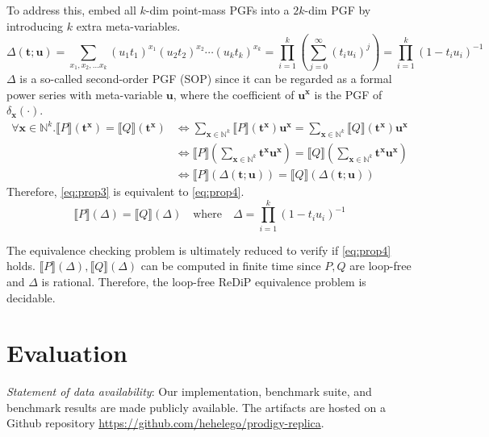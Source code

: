 \documentclass[a4paper]{article}
\renewcommand{\S}[1]{ \llbracket #1 \rrbracket }
\begin{document}
\begin{enumerate}
	      To address this, embed all \(k\)-dim point-mass PGFs into a \(2k\)-dim PGF by introducing \(k\) extra meta-variables.
	      \[
		      \Delta(\mathbf{t};\mathbf{u})
		      = \sum_{x_1,x_2,\ldots x_k} (u_1 t_1)^{x_1}(u_2 t_2)^{x_2}\cdots (u_k t_k)^{x_k}
		      = \prod_{i=1}^k \left( \sum_{j=0}^\infty (t_i u_i)^j \right)
		      = \prod_{i=1}^k (1-t_i u_i)^{-1}
	      \]
	      \(\Delta\) is a so-called second-order PGF (SOP) since it can be regarded as a formal power series with meta-variable \(\mathbf{u}\),
	      where the coefficient of \(\mathbf{u}^{\mathbf{x}}\) is the PGF of \(\delta_{\mathbf{x}}(\cdot)\).
	      \begin{align*}
		      \forall \mathbf{x} \in \mathbb{N}^k . \S{P}(\mathbf{t}^{\mathbf{x}}) = \S{Q}(\mathbf{t}^{\mathbf{x}})
		       & \iff
		      \sum_{\mathbf{x}\in\mathbb{N}^k} \S{P}(\mathbf{t}^{\mathbf{x}}) \mathbf{u}^\mathbf{x}
		      = \sum_{\mathbf{x}\in\mathbb{N}^k} \S{Q}(\mathbf{t}^{\mathbf{x}}) \mathbf{u}^\mathbf{x}              \\
		       & \iff
		      \S{P}\left( \sum_{\mathbf{x}\in\mathbb{N}^k} \mathbf{t}^{\mathbf{x}} \mathbf{u}^\mathbf{x} \right)
		      = \S{Q}\left( \sum_{\mathbf{x}\in\mathbb{N}^k} \mathbf{t}^{\mathbf{x}} \mathbf{u}^\mathbf{x} \right) \\
		       & \iff \S{P}(\Delta(\mathbf{t};\mathbf{u}))
		      = \S{Q}(\Delta(\mathbf{t};\mathbf{u}))
	      \end{align*}
	      Therefore, \eqref{eq:prop3} is equivalent to \eqref{eq:prop4}.
	      \begin{equation}
		      \S{P}(\Delta) = \S{Q}(\Delta)
			  \quad
			  \text{where}
			  \quad
		      \Delta = \prod_{i=1}^k (1-t_i u_i)^{-1}
		      \label{eq:prop4}
	      \end{equation}
\end{enumerate}

The equivalence checking problem is ultimately reduced to verify if \eqref{eq:prop4} holds.
\(\S{P}(\Delta),\S{Q}(\Delta)\) can be computed in finite time since \(P,Q\) are loop-free and \(\Delta\) is rational.
Therefore, the loop-free ReDiP equivalence problem is decidable.

\section{Evaluation}

\emph{Statement of data availability}: Our implementation, benchmark suite, and benchmark results are made publicly available.
The artifacts are hosted on a Github repository \href{https://github.com/hehelego/prodigy-replica}{https://github.com/hehelego/prodigy-replica}.
\end{document}
